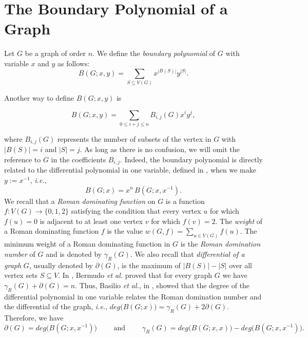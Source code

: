 \documentclass[review]{elsarticle}
\newcommand{\g}{\gamma}
\begin{document}
\section{The Boundary Polynomial of a Graph}\label{sect:Poly}
Let $G$ be a graph of order $n$. We define the \emph{boundary polynomial} of $G$ with variable $x$ and $y$ as follows:
\begin{equation}\label{eq:Poly1}
    B(G;x,y) = \sum_{S \subseteq V(G)}x^{|B(S)|}y^{|S|}.
\end{equation}

Another way to define $B(G;x,y)$ is

\begin{equation}\label{eq:Poly2}
    B(G;x,y) = \sum_{0 \leq i+j \leq n}B_{i,j}(G)x^{i}y^{j},
\end{equation}

where $B_{i,j}(G)$ represents the number of subsets of the vertex in $G$ with $|B(S)| = i$ and $|S| = j$. As long as there is no confusion, we will omit the reference to $G$ in the coefficients $B_{i,j}$. 
Indeed, the boundary polynomial is directly related to the differential polynomial in one variable, defined in \cite{BCLS}, when we make $y:=x^{-1}$, \emph{i.e.}, 
\begin{equation}\label{eq:1var_2var}
  B(G;x)=x^n\,B(G;x,x^{-1}).
\end{equation}
We recall that a {\em Roman dominating function} on $G$ is a function $f:V(G)\rightarrow \{0,1,2\}$ satisfying the condition that every vertex $u$ for which $f(u)=0$ is adjacent to at least one vertex $v$ for which $f(v)=2$. The \emph{weight} of a Roman dominating function $f$ is the value $w(G,f)=\sum_{u\in V(G)}f(u)$. The minimum weight of a Roman dominating function in $G$ is the {\em Roman domination number} of $G$ and is denoted by $\g_R(G)$. 
We also recall that \emph{differential of a graph} $G$, usually denoted by $\partial(G)$, is the maximum of $|B(S)|-|S|$ over all vertex sets $S\subseteq V$. In \cite{BFS}, Bermudo \emph{et al.} proved that for every graph $G$ we have $\g_R(G)+\partial(G)=n$. 
Thus, Basilio \emph{et al.}, in \cite{BCLS}, showed that the degree of the differential polynomial in one variable relates the Roman domination number and the differential of the graph, \emph{i.e.}, $deg\big(B(G;x)\big)=\gamma_R(G)+2\partial(G)$. Therefore, we have
\begin{equation}\label{eq:Poly_deg}
    \partial(G) = deg\big(B(G;x,x^{-1})\big) \qquad \text{ and } \qquad \gamma_R(G) = deg\big(B(G;x,x)\big)- deg\big(B(G;x,x^{-1})\big).
\end{equation}
\end{document}
